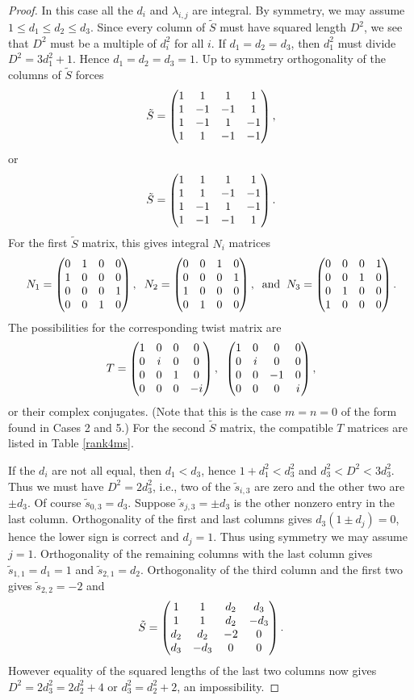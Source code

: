 \documentclass[12pt,psamsfonts]{amsart}
\newcommand{\tS}{\tilde{S}}
\numberwithin{equation}{section}
\theoremstyle{definition}
\begin{document}
\begin{proof}
In this case all the $d_i$ and $\lambda_{i,j}$ are integral. By
symmetry, we may assume $1\le d_1\le d_2\le d_3$. Since every
column of $\tilde S$ must have squared length $D^2$, we see that
$D^2$ must be a multiple of $d_i^2$ for all $i$. If $d_1=d_2=d_3$,
then $d_1^2$ must divide $D^2=3d_1^2+1$. Hence $d_1=d_2=d_3=1$. Up
to symmetry orthogonality of the columns of $\tilde S$ forces
$$\tilde S=\left(\begin{matrix} 1 & 1 & 1 & 1\cr 1 & -1 & -1 & 1\cr 1 & -1
& 1 & -1\cr 1 & 1 & -1 & -1\end{matrix}\right),$$ or
$$\tS=\left(\begin{matrix} 1 & 1 & 1 & 1\cr 1 & 1 & -1 & -1\cr 1 & -1
& 1 & -1\cr 1 & -1 & -1 & 1\end{matrix}\right).$$ For the first
$\tS$ matrix, this gives integral $N_i$ matrices
$$N_1=\left(\begin{matrix} 0 & 1 & 0 & 0\cr 1 & 0 & 0 & 0\cr 0 & 0
& 0 & 1\cr 0 & 0 & 1 & 0\end{matrix}\right),\;\;
N_2=\left(\begin{matrix} 0 & 0 & 1 & 0\cr 0 & 0 & 0 & 1\cr 1 & 0 &
0 & 0\cr 0 & 1 & 0 & 0\end{matrix}\right),\;\; {\rm and}\;\;
N_3=\left(\begin{matrix} 0 & 0 & 0 & 1\cr 0 & 0 & 1 & 0\cr 0 & 1 &
0 & 0\cr 1 & 0 & 0 & 0\end{matrix}\right).$$ The possibilities for
the corresponding twist matrix are
$$T=\left(\begin{matrix} 1 & 0 & 0 & 0\cr 0 & i & 0 & 0\cr 0 & 0
& 1 & 0\cr 0 & 0 & 0 & -i\end{matrix}\right),\;\;
\left(\begin{matrix} 1 & 0 & 0 & 0\cr 0 & i & 0 & 0\cr 0 & 0 & -1
& 0\cr 0 & 0 & 0 & i\end{matrix}\right),$$ or their complex
conjugates. (Note that this is the case $m=n=0$ of the form found
in Cases 2 and 5.) For the second $\tS$ matrix, the compatible $T$
matrices are listed in Table \ref{rank4ms}.

If the $d_i$ are not all equal, then $d_1<d_3$, hence
$1+d_1^2<d_3^2$ and $d_3^2<D^2<3 d_3^2$. Thus we must have $D^2=2
d_3^2$, i.e., two of the $\tilde s_{i,3}$ are zero and the other
two are $\pm d_3$. Of course $\tilde s_{0,3}=d_3$. Suppose $\tilde
s_{j,3}=\pm d_3$ is the other nonzero entry in the last column.
Orthogonality of the first and last columns gives $d_3(1\pm
d_j)=0$, hence the lower sign is correct and $d_j=1$. Thus using
symmetry we may assume $j=1$. Orthogonality of the remaining
columns with the last column gives $\tilde s_{1,1}=d_1=1$ and
$\tilde s_{2,1}=d_2$. Orthogonality of the third column and the
first two gives $\tilde s_{2,2}=-2$ and
$$\tilde S=\left(\begin{matrix} 1 & 1 & d_2 & d_3\cr 1 & 1 & d_2 & -d_3\cr
d_2 & d_2 & -2 & 0\cr d_3 & -d_3 & 0 & 0\end{matrix}\right).$$
However equality of the squared lengths of the last two columns
now gives $D^2=2d_3^2=2d_2^2+4$ or $d_3^2=d_2^2+2$, an
impossibility.

\end{proof}
\end{document}
